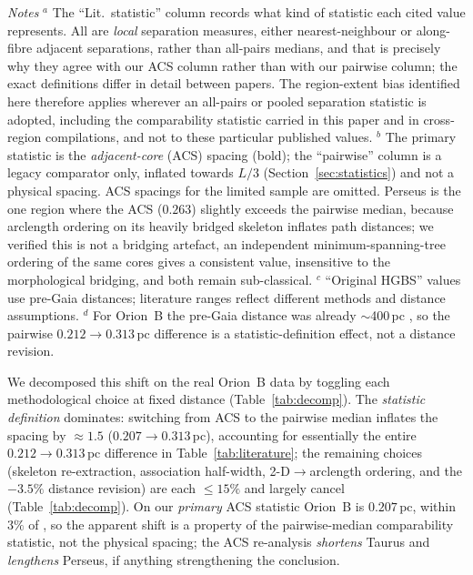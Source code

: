 \documentclass[usenatbib,twoside,twocolumn]{mnras}
\begin{document}
\begin{table}
\vspace{0.1in}
\footnotesize
\emph{Notes} $^{a}$ The ``Lit.\ statistic'' column records what kind of statistic each cited value represents. All are \emph{local} separation measures, either nearest-neighbour or along-fibre adjacent separations, rather than all-pairs medians, and that is precisely why they agree with our ACS column rather than with our pairwise column; the exact definitions differ in detail between papers. The region-extent bias identified here therefore applies wherever an all-pairs or pooled separation statistic is adopted, including the comparability statistic carried in this paper and in cross-region compilations, and not to these particular published values. $^{b}$ The primary statistic is the \emph{adjacent-core} (ACS) spacing (bold); the ``pairwise'' column is a legacy comparator only, inflated towards $L/3$ (Section~\ref{sec:statistics}) and not a physical spacing. ACS spacings for the limited sample are omitted. Perseus is the one region where the ACS ($0.263$) slightly exceeds the pairwise median, because arclength ordering on its heavily bridged skeleton inflates path distances; we verified this is not a bridging artefact, an independent minimum-spanning-tree ordering of the same cores gives a consistent value, insensitive to the morphological bridging, and both remain sub-classical. $^{c}$ ``Original HGBS'' values use pre-Gaia distances; literature ranges reflect different methods and distance assumptions. $^{d}$ For Orion~B the pre-Gaia distance was already $\sim$400\,pc \citep{Konyves2020}, so the pairwise $0.212\to0.313$\,pc difference is a statistic-definition effect, not a distance revision.
\end{table}

We decomposed this shift on the real Orion~B data by toggling each methodological choice at fixed distance (Table~\ref{tab:decomp}). The \emph{statistic definition} dominates: switching from ACS to the pairwise median inflates the spacing by $\approx1.5$ ($0.207\to0.313$\,pc), accounting for essentially the entire $0.212\to0.313$\,pc difference in Table~\ref{tab:literature}; the remaining choices (skeleton re-extraction, association half-width, 2-D$\to$arclength ordering, and the $-3.5\%$ distance revision) are each $\le15\%$ and largely cancel (Table~\ref{tab:decomp}). On our \emph{primary} ACS statistic Orion~B is $0.207$\,pc, within $3\%$ of \citet{Konyves2020}, so the apparent shift is a property of the pairwise-median comparability statistic, not the physical spacing; the ACS re-analysis \emph{shortens} Taurus and \emph{lengthens} Perseus, if anything strengthening the conclusion.
\end{document}
